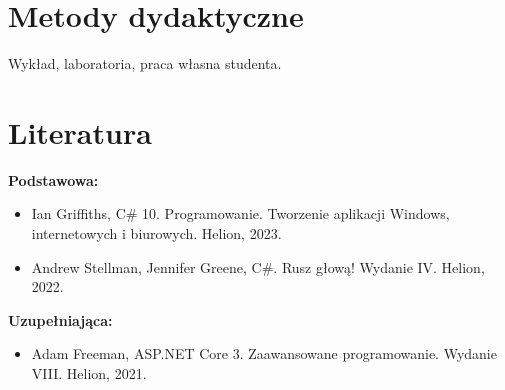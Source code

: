 \documentclass[12pt, a4paper]{article}
\begin{document}
\section{Metody dydaktyczne}

Wykład, laboratoria, praca własna studenta.

\section{Literatura}

\textbf{Podstawowa:}
\begin{itemize}
  \item Ian Griffiths, C\# 10. Programowanie. Tworzenie aplikacji Windows, internetowych i biurowych. Helion, 2023.
  \item Andrew Stellman, Jennifer Greene, C\#. Rusz głową! Wydanie IV. Helion, 2022.
\end{itemize}

\textbf{Uzupełniająca:}
\begin{itemize}
  \item Adam Freeman, ASP.NET Core 3. Zaawansowane programowanie. Wydanie VIII. Helion, 2021.
\end{itemize}
\end{document}
